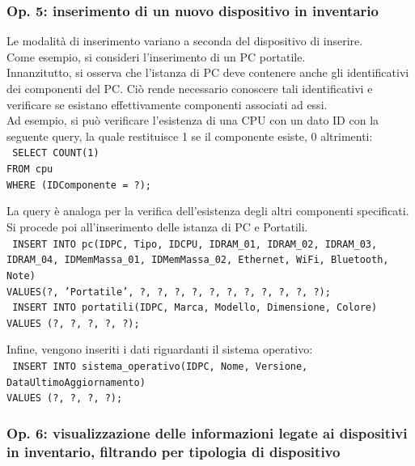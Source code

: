 \documentclass[a4paper,12pt]{report}
\begin{document}
\subsubsection{Op. 5: inserimento di un nuovo dispositivo in inventario}

Le modalità di inserimento variano a seconda del dispositivo di inserire. \\
\noindent Come esempio, si consideri l'inserimento di un PC portatile. \\

\noindent Innanzitutto, si osserva che l'istanza di PC deve contenere anche gli identificativi dei componenti del PC. Ciò rende necessario conoscere tali identificativi e verificare se esistano effettivamente componenti associati ad essi. \\
Ad esempio, si può verificare l'esistenza di una CPU con un dato ID con la seguente query, la quale restituisce 1 se il componente esiste, 0 altrimenti: \\

\noindent \texttt{
SELECT COUNT(1) \\
FROM cpu \\
WHERE (IDComponente = ?); \\
}

\noindent La query è analoga per la verifica dell'esistenza degli altri componenti specificati. \\

\noindent Si procede poi all'inserimento delle istanza di PC e Portatili. \\

\noindent \texttt{
INSERT INTO pc(IDPC, Tipo, IDCPU, IDRAM\_01, IDRAM\_02, IDRAM\_03, IDRAM\_04, IDMemMassa\_01, IDMemMassa\_02, Ethernet, WiFi, Bluetooth, Note) \\
VALUES(?, 'Portatile', ?, ?, ?, ?, ?, ?, ?, ?, ?, ?, ?);
} \\

\noindent \texttt{
INSERT INTO portatili(IDPC, Marca, Modello, Dimensione, Colore)
VALUES (?, ?, ?, ?, ?);
}

\noindent Infine, vengono inseriti i dati riguardanti il sistema operativo: \\
\texttt{
INSERT INTO sistema\_operativo(IDPC, Nome, Versione, \\
DataUltimoAggiornamento) \\
VALUES (?, ?, ?, ?);
}

\subsubsection{Op. 6: visualizzazione delle informazioni legate ai dispositivi in inventario, filtrando per tipologia di dispositivo}
\end{document}
